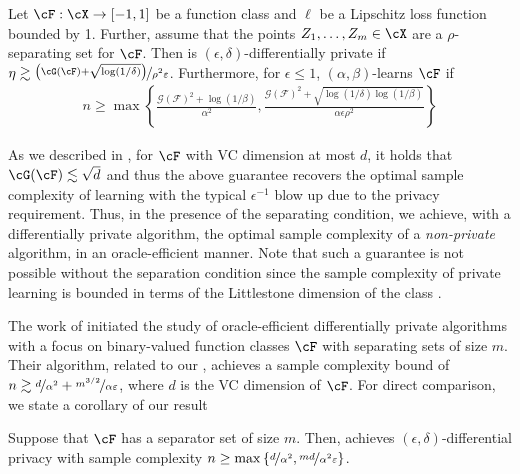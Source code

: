     

    
    \begin{theorem}
        \label{thm:main_privacy}
        Let $\cF: \cX \to [-1,1]$ be a function class and $\ell$ be a Lipschitz loss function bounded by 1. 
        Further, assume that the points $Z_1, \dots, Z_m \in \cX$ are a $\rho$-separating set for $\cF$.  Then  is $(\epsilon, \delta)$-differentially private if $\eta \gtrsim \nicefrac{\left( \cG(\cF) + \sqrt{\log(1/\delta)} \right)}{\rho^2\epsilon}$.
        Furthermore, for $\epsilon \leq 1$,  $(\alpha, \beta)$-learns $\cF$ if 
        \begin{align}
            n \geq \max\left\{  \frac{ \mathcal{G} ( \mathcal{F}   )^2 + \log(1/\beta) }{  \alpha^2} ,  \frac{ \mathcal{G} ( \mathcal{F}   )^2 + \sqrt{ \log(1/\delta) \log(1/\beta) } }{ \alpha \epsilon \rho^2  }    \right\}
        \end{align}
        
        
        
    \end{theorem}
    As we described in , for $\cF$ with VC dimension at most $d$, it holds that $\cG(\cF) \lesssim \sqrt{d} $ and thus the above guarantee recovers the optimal sample complexity of learning \citep{shai} with the typical $\epsilon^{-1}$ blow up due to the privacy requirement.
    Thus, in the presence of the separating condition, we achieve, with a differentially private algorithm, the optimal sample complexity of a \emph{non-private} algorithm, in an oracle-efficient manner.
    Note that such a guarantee is not possible without the separation condition since the sample complexity of private learning is bounded in terms of the Littlestone dimension of the class \citep{AlonLMM19}. 

    
    The work of \citet{Neel0VW20} initiated the study of oracle-efficient differentially private algorithms with a focus on binary-valued function classes $\cF$ with separating sets of size $m$.  Their algorithm, related to our , achieves a sample complexity bound of $n \gtrsim \nicefrac{d}{\alpha^2} + \nicefrac{m^{3/2}}{\alpha \epsilon}$, where $d$ is the VC dimension of $\cF$.  
    For direct comparison, we state a corollary of our result 

    \begin{corollary}
        Suppose that $\cF$ has a separator set of size $m$.  Then,  achieves $(\epsilon, \delta)$-differential privacy with sample complexity $ n \geq \max\left\{ \nicefrac{d}{\alpha^2} , \nicefrac{m d}{\alpha^2 \epsilon} \right\}  $.
    \end{corollary}
    
